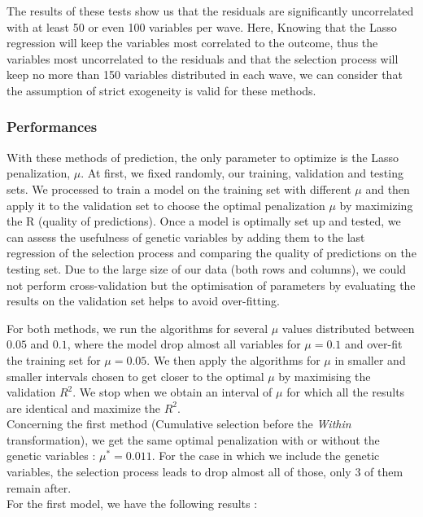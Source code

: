 \documentclass[]{article}
\begin{document}
The results of these tests show us that the residuals are significantly uncorrelated with at least 50 or even 100 variables per wave. Here, Knowing that the Lasso regression will keep the variables most correlated to the outcome, thus the variables most uncorrelated to the residuals and that the selection process will keep no more than 150 variables distributed in each wave, we can consider that the assumption of strict exogeneity is valid for these methods.

\subsubsection{Performances}


With these methods of prediction, the only parameter to optimize is the Lasso penalization, $\mu$. At first, we fixed randomly, our training, validation and testing sets. We processed to train a model on the training set with different $\mu$ and then apply it to the validation set to choose the optimal penalization $\mu$ by maximizing the R (quality of predictions). Once a model is optimally set up and tested, we can assess the usefulness of genetic variables by adding them to the last regression of the selection process and comparing the quality of predictions on the testing set. Due to the large size of our data (both rows and columns), we could not perform cross-validation but the optimisation of parameters by evaluating the results on the validation set helps to avoid over-fitting.

For both methods, we run the algorithms for several $\mu$ values distributed between $0.05$ and $0.1$, where the model drop almost all variables for $\mu = 0.1$ and over-fit the training set for $\mu = 0.05$. We then apply the algorithms for $\mu$ in smaller and smaller intervals chosen to get closer to the optimal $\mu$ by maximising the validation $R^2$. We stop when we obtain an interval of $\mu$ for which all the results are identical and maximize the $R^2$.\\

Concerning the first method (Cumulative selection before the \textit{Within} transformation), we get the same optimal penalization with or without the genetic variables : $\mu^* = 0.011$. For the case in which we include the genetic variables, the selection process leads to drop almost all of those, only 3 of them remain after.\\

For the first model, we have the following results :
\end{document}
